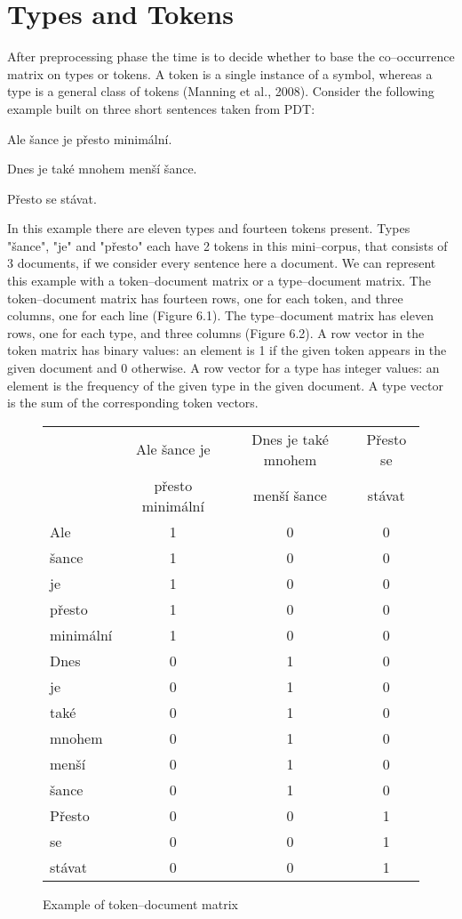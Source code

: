 \section{Types and Tokens}
After preprocessing phase the time is to decide whether to base the co--occurrence matrix on types or tokens. A token is a single instance of a symbol, whereas a type is a general class of tokens (Manning et al., 2008). Consider the following example built on three short sentences taken from  PDT:
\begin{examples}
\item Ale \v{s}ance je p\v{r}esto minim\'aln\'i.
\item Dnes je tak\'e mnohem men\v{s}\'i \v{s}ance.
\item P\v{r}esto se st\'avat.
\end{examples}
In this example there are eleven types and fourteen tokens present. Types "\v{s}ance", "je" and "p\v{r}esto" each have 2 tokens in this mini--corpus, that consists of 3 documents, if we consider every sentence here a document. We can represent this example with a token--document matrix or a type--document matrix. The token--document matrix has fourteen rows, one for each token, and three columns, one for each line (Figure 6.1). The type--document matrix has eleven rows, one for each type, and three columns (Figure 6.2). A row vector in the token matrix has binary values: an element is 1 if the given token appears in
the given document and 0 otherwise. A row vector for a type has integer values: an element is the frequency of the given type in the given document. A type vector is the sum of the corresponding token vectors.


\begin{figure}[h!]
\begin{center}
	\begin{tabular}{ l | c c c }
   	&  Ale \v{s}ance je  & Dnes je tak\'e mnohem & P\v{r}esto se \\
	& p\v{r}esto minim\'aln\'i & men\v{s}\'i \v{s}ance & st\'avat \\
  	\hline                       
  	Ale & 1 & 0 & 0 \\
  	\v{s}ance & 1 & 0 & 0 \\
  	je & 1 & 0 & 0 \\
  	p\v{r}esto & 1 & 0 & 0 \\
  	minim\'aln\'i & 1 & 0 & 0 \\
	Dnes & 0 & 1 & 0 \\
	je  & 0 & 1 & 0 \\
	tak\'e & 0 & 1 & 0 \\
	mnohem & 0 & 1 & 0 \\
	men\v{s}\'i & 0 & 1 & 0 \\
	\v{s}ance & 0 & 1 & 0 \\
	P\v{r}esto  & 0 & 0 & 1 \\
	se  & 0 & 0 & 1 \\
	st\'avat & 0 & 0 & 1 \\
	\end{tabular}
\end{center}
\caption{Example of token--document matrix}
\end{figure}

